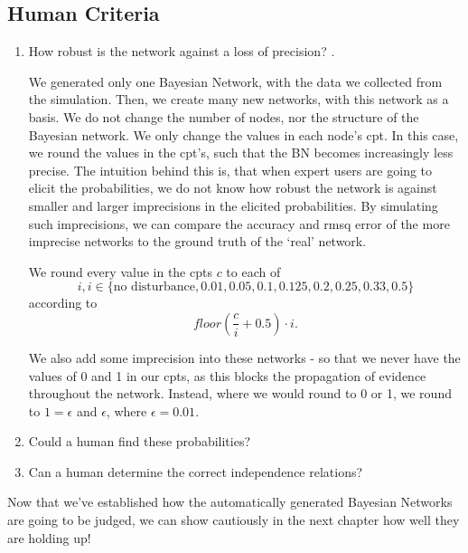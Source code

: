 \subsection{Human Criteria}
\begin{enumerate}


\item How robust is the network against a loss of precision? \citep{Druzdzel2013}.

We generated only one Bayesian Network, with the data we collected from the simulation. Then, we create many new networks, with this network as a basis. We do not change the number of nodes, nor the structure of the Bayesian network. We only change the values in each node's cpt. In this case, we round the values in the cpt's, such that the BN becomes increasingly less precise. The intuition behind this is, that when expert users are going to elicit the probabilities, we do not know how robust the network is against smaller and larger imprecisions in the elicited probabilities. By simulating such imprecisions, we can compare the accuracy and rmsq error of the more imprecise networks to the ground truth of the `real' network. 

We round every value in the cpts $c$ to each of \[i, i \in \{\text{no disturbance}, 0.01, 0.05, 0.1, 0.125, 0.2, 0.25, 0.33, 0.5\} \] according to \[ floor(\frac{c}{i} + 0.5) \cdot i.\]

We also add some imprecision into these networks - so that we never have the values of 0 and 1 in our cpts, as this blocks the propagation of evidence throughout the network. Instead, where we would round to 0 or 1, we round to $1 = \epsilon$ and $\epsilon$, where $\epsilon = 0.01$.

\item Could a human find these probabilities?

\item Can a human determine the correct independence relations?

\end{enumerate}

Now that we've established how the automatically generated Bayesian Networks are going to be judged, we can show cautiously in the next chapter how well they are holding up!


